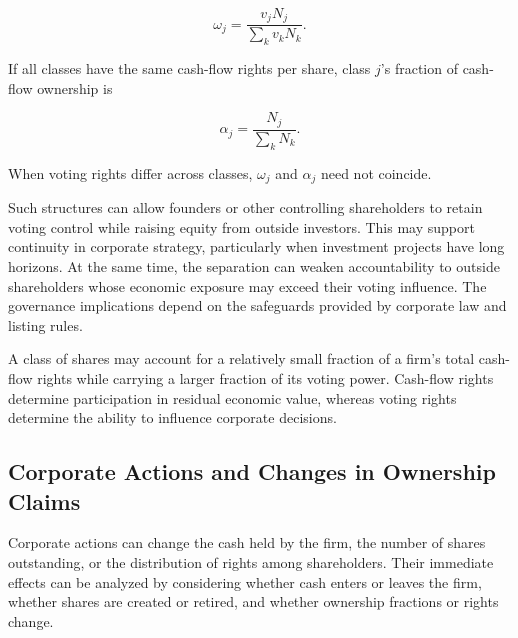 \begin{equation}
\omega_j
=
\frac{v_jN_j}{\sum_k v_kN_k}.
\label{eq:ch9-voting-power}
\end{equation}

If all classes have the same cash-flow rights per share, class \(j\)'s fraction of cash-flow ownership is

\begin{equation}
\alpha_j
=
\frac{N_j}{\sum_k N_k}.
\label{eq:ch9-cash-flow-share}
\end{equation}

When voting rights differ across classes, \(\omega_j\) and \(\alpha_j\) need not coincide.

Such structures can allow founders or other controlling
shareholders to retain voting control while raising
equity from outside investors. This may support
continuity in corporate strategy, particularly when
investment projects have long horizons. At the same
time, the separation can weaken accountability to
outside shareholders whose economic exposure may
exceed their voting influence. The governance
implications depend on the safeguards provided by
corporate law and listing rules.

\begin{tcolorbox}[
  enhanced,
  breakable,
  colback=white,
  colframe=FinanceBlue,
  boxrule=0.7pt,
  sharp corners,
  borderline west={2.2pt}{0pt}{FinanceBlue},
  title=\textbf{Financial Perspective: Cash-Flow Rights and Voting Rights Need Not Coincide},
  coltitle=white,
  colbacktitle=FinanceBlue,
  fonttitle=\bfseries,
  before skip=1.2em,
  after skip=1.2em
]

A class of shares may account for a relatively small
fraction of a firm's total cash-flow rights while
carrying a larger fraction of its voting power.
Cash-flow rights determine participation in residual
economic value, whereas voting rights determine the
ability to influence corporate decisions.

\end{tcolorbox}

\subsection{Corporate Actions and Changes in Ownership Claims}

Corporate actions can change the cash held by the firm, the number of shares outstanding, or the distribution of rights among shareholders. Their immediate effects can be analyzed by considering whether cash enters or leaves the firm, whether shares are created or retired, and whether ownership fractions or rights change.

